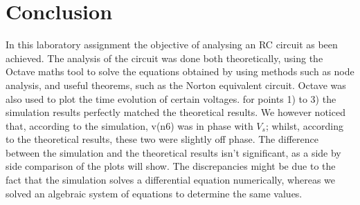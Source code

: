 \section{Conclusion}
\label{sec:conclusion}

In this laboratory assignment the objective of analysing an RC circuit as 
been achieved. The  analysis  of  the circuit was done both theoretically,
 using the Octave maths tool to solve the equations obtained by using methods
  such as node analysis, and useful theorems, such as the Norton equivalent circuit.
   Octave was also used to plot the time evolution of certain voltages. for points 1)
    to 3) the simulation results perfectly matched the theoretical results. We however 
    noticed that, according to the simulation, v(n6) was in phase with $V_s$; whilst, according
     to the theoretical results, these two were slightly off phase. The difference between the
      simulation and the theoretical results isn't significant, as a side by side comparison 
      of the plots will show. The discrepancies might be due to the fact that the simulation 
      solves a differential equation numerically, whereas we solved an algebraic system of 
      equations to determine the same values.